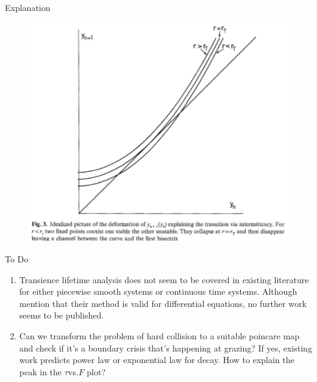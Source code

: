 \documentclass[xcolor=x11names,compress]{beamer}
\renewcommand{\(}{\begin{columns}}
\renewcommand{\)}{\end{columns}}
\newcommand{\<}[1]{\begin{column}{#1}}
\renewcommand{\>}{\end{column}}
\begin{document}
\begin{frame}{Explanation}
\begin{figure}
\begin{center}
\includegraphics[width=0.8\columnwidth]{intermit-lorenz-expl}
\end{center}
\end{figure}
\end{frame}




\begin{frame}{To Do}
\begin{enumerate}
\item Transience lifetime analysis does not seem to be covered in existing 
literature for either piecewise smooth systems or continuous time systems. 
Although \cite{greboji-coalesce} mention that their method is valid for 
differential equations, no further work seems to be published.  
\item Can we transform the problem of hard collision to a suitable poincare 
map and check if it's a boundary crisis that's happening at grazing? If yes, 
existing work predicts power law or exponential law for decay.  How to explain 
the peak in the $\tau$vs.$F$  plot?
\end{enumerate}
\end{frame}
\end{document}
